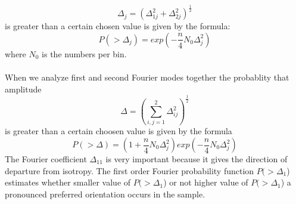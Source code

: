 \begin{equation}
\Delta_j=\left(\Delta_{1j}^2+\Delta_{2j}^2\right)^\frac{1}{2}
\end{equation}
\noindent is greater than a certain chosen value is given by the formula:
\begin{equation}
P(>\Delta_j)=exp\left(-\frac{n}{4}N_0\Delta_j^2\right)
\end{equation}
where $N_0$ is the numbers per bin.\\\\
When we analyze first and second Fourier modes together the probablity that amplitude
\begin{equation}
\Delta=\left(\sum_{i,j=1}^2\Delta_{ij}^2\right)^{\frac{1}{2}}
\end{equation}
is greater than a certain choosen value is given by the formula
\begin{equation}
P(>\Delta)=\left(1+\frac{n}{4}N_0\Delta_j^2\right)exp\left(-\frac{n}{4}N_0\Delta_j^2\right)
\end{equation}
The Fourier coefficient $\Delta_{11}$ is very important because it
gives the direction of departure from isotropy. The first order
Fourier probability function $P(>\Delta_{1}$) estimates
whether smaller value of $P(>\Delta_{1}$) or not higher value
of $P(>\Delta_{1}$) a pronounced preferred orientation occurs
in the sample.\\\\
